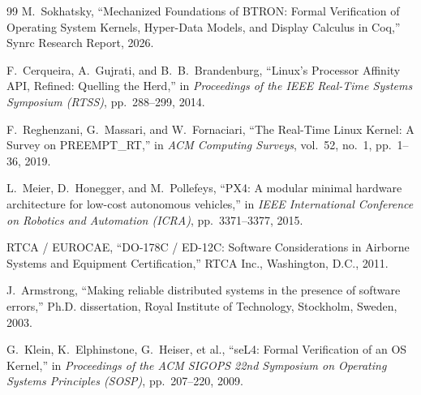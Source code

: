 \documentclass[10pt,journal,compsoc,twocolumn]{article}
\begin{document}
\begin{thebibliography}{99}
M.~Sokhatsky, ``Mechanized Foundations of BTRON: Formal Verification of Operating System Kernels, Hyper-Data Models, and Display Calculus in Coq,'' Synrc Research Report, 2026.

F.~Cerqueira, A.~Gujrati, and B.~B.~Brandenburg, ``Linux's Processor Affinity API, Refined: Quelling the Herd,'' in \emph{Proceedings of the IEEE Real-Time Systems Symposium (RTSS)}, pp.~288--299, 2014.

F.~Reghenzani, G.~Massari, and W.~Fornaciari, ``The Real-Time Linux Kernel: A Survey on PREEMPT\_RT,'' in \emph{ACM Computing Surveys}, vol.~52, no.~1, pp.~1--36, 2019.

L.~Meier, D.~Honegger, and M.~Pollefeys, ``PX4: A modular minimal hardware architecture for low-cost autonomous vehicles,'' in \emph{IEEE International Conference on Robotics and Automation (ICRA)}, pp.~3371--3377, 2015.

RTCA / EUROCAE, ``DO-178C / ED-12C: Software Considerations in Airborne Systems and Equipment Certification,'' RTCA Inc., Washington, D.C., 2011.

J.~Armstrong, ``Making reliable distributed systems in the presence of software errors,'' Ph.D. dissertation, Royal Institute of Technology, Stockholm, Sweden, 2003.

G.~Klein, K.~Elphinstone, G.~Heiser, et al., ``seL4: Formal Verification of an OS Kernel,'' in \emph{Proceedings of the ACM SIGOPS 22nd Symposium on Operating Systems Principles (SOSP)}, pp.~207--220, 2009.

\end{thebibliography}
\end{document}

